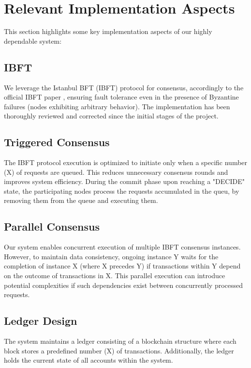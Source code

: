 \section{Relevant Implementation Aspects}

This section highlights some key implementation aspects of our highly dependable system:

\subsection{IBFT}
We leverage the Istanbul BFT (IBFT) protocol for consensus, accordingly to the official IBFT paper \cite{ibft-paper}, ensuring fault tolerance even in the presence of Byzantine failures (nodes exhibiting arbitrary behavior). The implementation has been thoroughly reviewed and corrected since the initial stages of the project.

\subsection{Triggered Consensus}
The IBFT protocol execution is optimized to initiate only when a specific number (X) of requests are queued. This reduces unnecessary consensus rounds and improves system efficiency. During the commit phase upon reaching a "DECIDE" state, the participating nodes process the requests accumulated in the queu, by removing them from the queue and executing them.

\subsection{Parallel Consensus}
Our system enables concurrent execution of multiple IBFT consensus instances. However, to maintain data consistency, ongoing instance Y waits for the completion of instance X (where X precedes Y) if transactions within Y depend on the outcome of transactions in X. This parallel execution can introduce potential complexities if such dependencies exist between concurrently processed requests. 

\subsection{Ledger Design}
The system maintains a ledger consisting of a blockchain structure where each block stores a predefined number (X) of transactions. Additionally, the ledger holds the current state of all accounts within the system.

